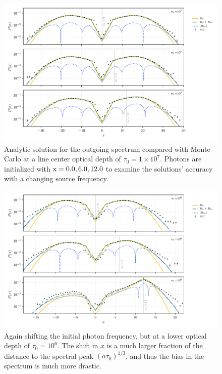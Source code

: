 \documentclass{aastex63}
\begin{document}
 \begin{figure}
    \centering
    \includegraphics{xinit_threepanel.pdf}
    \caption{Analytic solution for the outgoing spectrum compared with Monte Carlo at a line center optical depth of $\tau_0 = 1 \times 10^7$. Photons are initialized with $\rm x = 0.0, 6.0, 12.0$ to examine the solutions' accuracy with a changing source frequency.} 
    \label{fig:sol_mc_xinit}
\end{figure}

 \begin{figure}
    \centering
    \includegraphics{xinit_threepanel_tau1e6.pdf}
    \caption{Again shifting the initial photon frequency, but at a lower optical depth of $\tau_0 = 10^6$. The shift in $x$ is a much larger fraction of the distance to the spectral peak $(a\tau_0)^{1/3}$, and thus the bias in the spectrum is much more drastic. } 
    \label{fig:sol_mc_xinit_lowtau}
\end{figure}
\end{document}
